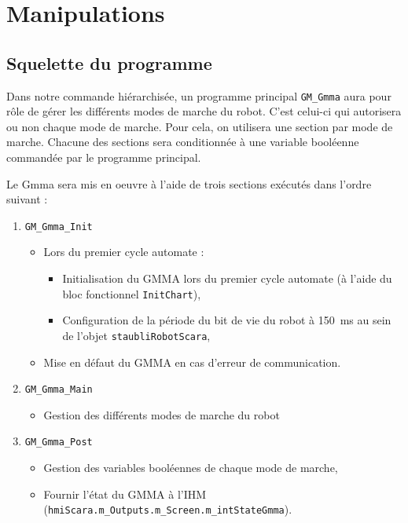 \section{Manipulations}
\label{sec:manipulations}
\subsection{Squelette du programme}
\label{subsect:squelette_du_programme}

Dans notre commande hiérarchisée, un programme principal \texttt{GM\_Gmma} aura pour rôle de gérer les différents modes de marche du robot. C'est celui-ci qui autorisera ou non chaque mode de marche. Pour cela, on utilisera une section par mode de marche. Chacune des sections sera conditionnée à une variable booléenne commandée par le programme principal.

Le Gmma sera mis en oeuvre à l'aide de trois sections exécutés dans l'ordre suivant :
\begin{enumerate}
    \item \texttt{GM\_Gmma\_Init}
    \begin{itemize}
        \item Lors du premier cycle automate : 
        \begin{itemize}
            \item Initialisation du GMMA lors du premier cycle automate (à l'aide du bloc fonctionnel \texttt{InitChart}),
            \item Configuration de la période du bit de vie du robot à \SI{150}{ms} au sein de l'objet \texttt{staubliRobotScara},
        \end{itemize}
        \item Mise en défaut du GMMA en cas d'erreur de communication.
    \end{itemize}
    \item \texttt{GM\_Gmma\_Main}
    \begin{itemize}
        \item Gestion des différents modes de marche du robot
    \end{itemize}
    \item \texttt{GM\_Gmma\_Post}
    \begin{itemize}
        \item Gestion des variables booléennes de chaque mode de marche,
        \item Fournir l'état du GMMA à l'IHM (\texttt{hmiScara.m\_Outputs.m\_Screen.m\_intStateGmma}).
    \end{itemize}
\end{enumerate}

